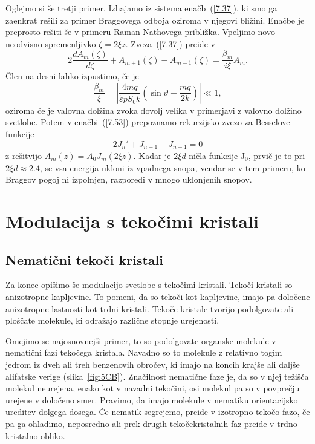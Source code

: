 Oglejmo si še tretji primer. Izhajamo iz sistema enačb~(\ref{7.37}), ki smo ga 
zaenkrat rešili za primer Braggovega odboja oziroma v njegovi bližini. 
Enačbe je preprosto rešiti še v primeru Raman-Nathovega približka. 
Vpeljimo novo neodvisno spremenljivko $\zeta=2\xi z$. 
Zveza~(\ref{7.37})
preide v 
\begin{equation}
2\frac{dA_{m}(\zeta)}{d\zeta}+A_{m+1}(\zeta)-A_{m-1}(\zeta)=\frac{\beta_{m}}{i\xi}A_{m}.
\label{7.53}
\end{equation}
 Člen na desni lahko izpustimo, če je 
\begin{equation}
\frac{\beta_{m}}{\xi}=\left| \frac{4mq}{\tilde{\varepsilon}pS_0k}(\sin\vartheta+\frac{mq}{2k})\right| 
\ll 1,
\label{7.54}
\end{equation}
oziroma če je valovna dolžina zvoka dovolj velika v primerjavi z valovno dolžino svetlobe. Potem 
v enačbi~(\ref{7.53}) prepoznamo rekurzijsko zvezo za Besselove funkcije 
\begin{equation}
2J_{n}'+J_{n+1}-J_{n-1}=0
\label{7.55}
\end{equation}
z rešitvijo $A_{m}(z)=A_{0}J_{m}(2\xi z)$. Kadar je $2\xi d$ ničla funkcije
J$_{0}$, prvič je to pri $2\xi d\approx 2.4$, se vsa energija ukloni iz
vpadnega snopa, vendar se v tem primeru, ko Braggov pogoj ni izpolnjen,
razporedi v mnogo uklonjenih snopov.

\section{Modulacija s tekočimi kristali}

\subsection*{Nematični tekoči kristali}
Za konec opišimo še modulacijo svetlobe s tekočimi kristali. 
Tekoči kristali so anizotropne kapljevine. To pomeni, da so tekoči kot 
kapljevine, imajo pa določene anizotropne lastnosti kot trdni kristali. 
Tekoče kristale tvorijo podolgovate ali ploščate molekule, 
ki odražajo različne stopnje urejenosti. 

Omejimo se najosnovnejši
primer, to so podolgovate organske molekule v nematični fazi tekočega kristala. 
Navadno so to molekule z relativno togim jedrom iz
dveh ali treh benzenovih obročev, ki imajo na koncih krajše ali daljše
alifatske verige (slika~\ref{fig:5CB}). Značilnost nematične faze je, da
so v njej težišča molekul neurejena, enako kot v navadni tekočini, 
osi molekul pa so v povprečju urejene v določeno smer. Pravimo, da imajo molekule
v nematiku orientacijsko ureditev dolgega dosega. Če nematik segrejemo,
preide v izotropno tekočo fazo, če pa ga ohladimo, neposredno ali prek drugih
tekočekristalnih faz preide v trdno kristalno obliko. 

